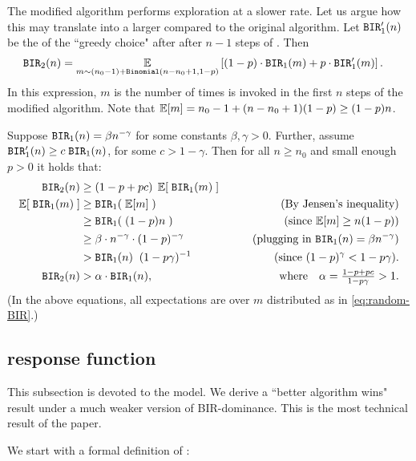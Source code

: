 \begin{remark}
The modified algorithm performs exploration %
at a slower rate. Let us argue how this may translate  into a larger \BIR compared to the original algorithm. Let  $\mathtt{BIR}'_1(n)$ be the \BIR of the ``greedy choice" after after $n-1$ steps of \alg[1]. Then
\begin{align}\label{eq:random-BIR}
\mathtt{BIR}_2(n)
    &= \operatorname*{\mathbb{E}}_{m\sim (n_0-1)+\mathtt{Binomial}(n-n_0+1,1-p)}\left[(1-p) \cdot \mathtt{BIR}_1(m) + p \cdot \mathtt{BIR}'_1(m)\right].
\end{align}
In this expression, $m$ is the number of times \alg[1] is invoked in the first $n$ steps of the modified algorithm. Note that
    $\E[m] = n_0-1 + (n-n_0+1)(1-p) \geq (1-p)n$.

Suppose $\mathtt{BIR}_1(n)= \beta n^{-\gamma}$ for some constants $\beta,\gamma>0$. Further, assume
    $\mathtt{BIR}'_1(n)\geq  c\; \mathtt{BIR}_1(n)$,
for some $c>1-\gamma$.
Then for all $n\geq n_0$ and small enough $p>0$ it holds that:
\begin{align*}
 \BIR_2(n)
    &\geq  (1-p+pc)\; \E[\; \BIR_1(m) \;] \\
\E[\; \BIR_1(m) \;]
    &\geq \BIR_1(\; \E[m] \;) &\qquad\text{(By Jensen's inequality)} \\
    &\geq \BIR_1(\; (1-p)n \;) &\qquad\text{(since $\E[m]\geq n(1-p)$)}  \\
    &\geq \beta\cdot n^{-\gamma} \cdot (1-p)^{-\gamma}
        &\qquad\text{(plugging in $\BIR_1(n)=\beta n^{-\gamma}$)}  \\
    &> \BIR_1(n)\;\; (1-p\gamma)^{-1}
        &\qquad\text{(since $(1-p)^\gamma < 1-p\gamma$)}.\\
\BIR_2(n)
    &>\alpha\cdot \BIR_1(n),
    &\text{where} \quad
    \alpha = \tfrac{1-p+pc}{1-p\gamma}>1.
\end{align*}
(In the above equations, all expectations are over $m$ distributed as in \eqref{eq:random-BIR}.)
\end{remark}

\subsection{\SoftMaxRandom response function}
\label{sec:theory-SoftMax}

This subsection is devoted to the \SoftMaxRandom model. We derive a ``better algorithm wins" result under a much weaker version of BIR-dominance. This is the most technical result of the paper.

We start with a formal definition of \SoftMaxRandom:

